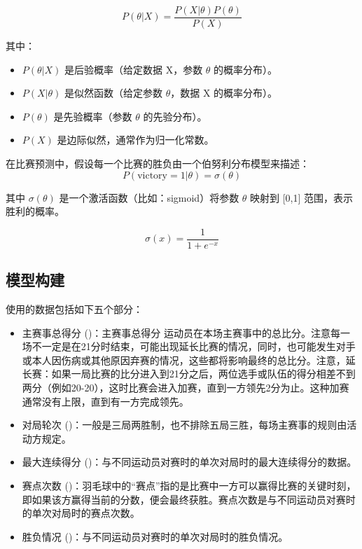 \documentclass[12pt]{article}
\begin{document}
\begin{equation}P(\theta|X)=\frac{P(X|\theta)P(\theta)}{P(X)}\end{equation}

其中：
\begin{itemize}
	\item $P(\theta|X)$ 是后验概率（给定数据 X，参数 $\theta$ 的概率分布）。
	\item $P(X|\theta)$ 是似然函数（给定参数 $\theta$，数据 X 的概率分布）。
	\item $P(\theta)$ 是先验概率（参数 $\theta$ 的先验分布）。
	\item $P(X)$ 是边际似然，通常作为归一化常数。
	\end{itemize}


在比赛预测中，假设每一个比赛的胜负由一个伯努利分布模型来描述：
\begin{equation}
	P(\mathrm{victory}=1|\theta)=\sigma(\theta)
	\end{equation}

其中 $\sigma(\theta)$ 是一个激活函数（比如：sigmoid）将参数 $\theta$ 映射到 [0,1] 范围，表示胜利的概率。

\begin{equation}
	\sigma(x)=\frac{1}{1+e^{-x}}
\end{equation}


\subsection{模型构建}
使用的数据包括如下五个部分：
\begin{itemize}
	\item 主赛事总得分 ()：主赛事总得分    运动员在本场主赛事中的总比分。注意每一场不一定是在21分时结束，可能出现延长比赛的情况，同时，也可能发生对手或本人因伤病或其他原因弃赛的情况，这些都将影响最终的总比分。注意，延长赛：如果一局比赛的比分进入到21分之后，两位选手或队伍的得分相差不到两分（例如20-20），这时比赛会进入加赛，直到一方领先2分为止。这种加赛通常没有上限，直到有一方完成领先。
	\item 对局轮次 ()：一般是三局两胜制，也不排除五局三胜，每场主赛事的规则由活动方规定。
	\item 最大连续得分 ()：与不同运动员对赛时的单次对局时的最大连续得分的数据。
	\item 赛点次数 ()：羽毛球中的“赛点”指的是比赛中一方可以赢得比赛的关键时刻，即如果该方赢得当前的分数，便会最终获胜。赛点次数是与不同运动员对赛时的单次对局时的赛点次数。
	\item 胜负情况 ()：与不同运动员对赛时的单次对局时的胜负情况。
\end{itemize}
\end{document}

